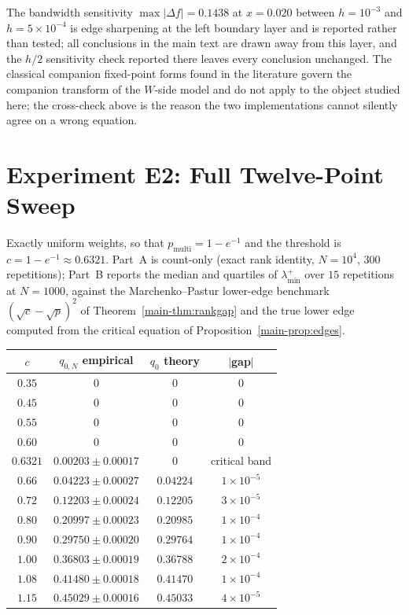 \documentclass[10pt,onecolumn]{IEEEtran}
\theoremstyle{remark}
\begin{document}
The bandwidth sensitivity $\max|\Delta f|=0.1438$ at $x=0.020$ between
$h=10^{-3}$ and $h=5\times10^{-4}$ is edge sharpening at the left boundary
layer and is reported rather than tested; all conclusions in the main text are
drawn away from this layer, and the $h/2$ sensitivity check reported there
leaves every conclusion unchanged. The classical companion fixed-point forms
found in the literature govern the companion transform of the $W$-side model
and do not apply to the object studied here; the cross-check above is the
reason the two implementations cannot silently agree on a wrong equation.

\section{Experiment E2: Full Twelve-Point Sweep}\label{sec:S24}

Exactly uniform weights, so that $p_{\mathrm{multi}}=1-e^{-1}$ and the
threshold is $c=1-e^{-1}\approx0.6321$. Part~A is count-only (exact rank
identity, $N=10^{4}$, $300$ repetitions); Part~B reports the median and
quartiles of $\lambda_{\min}^{+}$ over $15$ repetitions at $N=1000$, against
the Marchenko--Pastur lower-edge benchmark $(\sqrt c-\sqrt p)^2$ of
Theorem~\ref{main-thm:rankgap} and the true lower edge computed from the
critical equation of Proposition~\ref{main-prop:edges}.

\begin{center}
\renewcommand{\arraystretch}{1.15}
\begin{tabular}{cccc}
\toprule
$c$ & $q_{0,N}$ empirical & $q_0$ theory & $|$gap$|$ \\
\midrule
$0.35$   & $0$                  & $0$      & $0$ \\
$0.45$   & $0$                  & $0$      & $0$ \\
$0.55$   & $0$                  & $0$      & $0$ \\
$0.60$   & $0$                  & $0$      & $0$ \\
$0.6321$ & $0.00203\pm0.00017$  & $0$      & critical band \\
$0.66$   & $0.04223\pm0.00027$  & $0.04224$ & $1\times10^{-5}$ \\
$0.72$   & $0.12203\pm0.00024$  & $0.12205$ & $3\times10^{-5}$ \\
$0.80$   & $0.20997\pm0.00023$  & $0.20985$ & $1\times10^{-4}$ \\
$0.90$   & $0.29750\pm0.00020$  & $0.29764$ & $1\times10^{-4}$ \\
$1.00$   & $0.36803\pm0.00019$  & $0.36788$ & $2\times10^{-4}$ \\
$1.08$   & $0.41480\pm0.00018$  & $0.41470$ & $1\times10^{-4}$ \\
$1.15$   & $0.45029\pm0.00016$  & $0.45033$ & $4\times10^{-5}$ \\
\bottomrule
\end{tabular}
\end{center}
\end{document}
